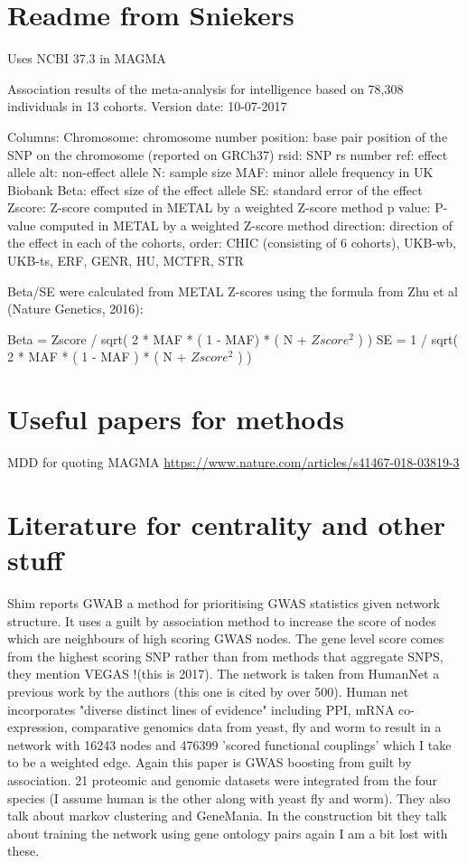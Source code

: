 \section{Readme from Sniekers}
\label{sec:notes readme from sniekers}

Uses NCBI 37.3 in MAGMA

     Association results of the meta-analysis for intelligence based on 78,308 individuals in 13 cohorts. 
     Version date: 10-07-2017

  Columns:
Chromosome: chromosome number
position: base pair position of the SNP on the chromosome (reported on GRCh37)
rsid: SNP rs number
ref: effect allele
alt: non-effect allele
N: sample size
MAF: minor allele frequency in UK Biobank
Beta: effect size of the effect allele
SE: standard error of the effect
Zscore: Z-score computed in METAL by a weighted Z-score method
p   value: P-value computed in METAL by a weighted Z-score method
direction: direction of the effect in each of the cohorts, order: CHIC (consisting of 6 cohorts), UKB-wb, UKB-ts, ERF, GENR, HU, MCTFR, STR

Beta/SE were calculated from METAL Z-scores using the formula from Zhu et al (Nature Genetics, 2016):

Beta = Zscore / sqrt( 2 * MAF * ( 1 - MAF) * ( N + $Zscore^2$ ) )
SE = 1 / sqrt( 2 * MAF * ( 1 - MAF ) * ( N + $Zscore^2$ ) )

\section{Useful papers for methods}

MDD for quoting MAGMA \url{https://www.nature.com/articles/s41467-018-03819-3}

\section{Literature for centrality and other stuff}
\label{sec:literature centrality and other stuff}
Shim \cite{shim2017gwab} reports GWAB a method for prioritising GWAS statistics given network structure. It uses a guilt by association method to increase the score of nodes which are neighbours of high scoring GWAS nodes. The gene level score comes from the highest scoring SNP rather than from methods that aggregate SNPS, they mention VEGAS !(this is 2017). The network is taken from HumanNet a previous work by the authors \cite{lee2011prioritizing} (this one is cited by over 500). Human net incorporates "diverse distinct lines of evidence" including PPI, mRNA co-expression, comparative genomics data from yeast, fly and worm to result in a network with 16243 nodes and 476399 'scored functional couplings' which I take to be a weighted edge. Again this paper is GWAS boosting from guilt by association. 21 proteomic and genomic datasets were integrated from the four species (I assume human is the other along with yeast fly and worm). They also talk about markov clustering and GeneMania. In the construction bit they talk about training the network using gene ontology pairs again I am a bit lost with these.  

